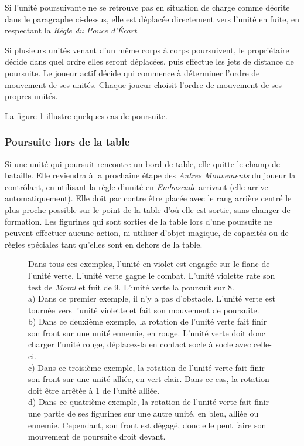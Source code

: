 Si l'unité poursuivante ne se retrouve pas en situation de charge comme décrite dans le paragraphe ci-dessus, elle est déplacée directement vers l'unité en fuite, en respectant la \emph{Règle du Pouce d'Écart}. 

Si plusieurs unités venant d'un même corps à corps poursuivent, le propriétaire décide dans quel ordre elles seront déplacées, puis effectue les jets de distance de poursuite. Le joueur actif décide qui commence à déterminer l'ordre de mouvement de ses unités. Chaque joueur choisit l'ordre de mouvement de ses propres unités.

La figure \ref{figure/poursuite} illustre quelques cas de poursuite.

\subsubsection*{Poursuite hors de la table}

Si une unité qui poursuit rencontre un bord de table, elle quitte le champ de bataille. Elle reviendra à la prochaine étape des \emph{Autres Mouvements} du joueur la contrôlant, en utilisant la règle d'unité en \emph{Embuscade} arrivant (elle arrive automatiquement). Elle doit par contre être placée avec le rang arrière centré le plus proche possible sur le point de la table d'où elle est sortie, sans changer de formation. Les figurines qui sont sorties de la table lors d'une poursuite ne peuvent effectuer aucune action, ni utiliser d'objet magique, de capacités ou de règles spéciales tant qu'elles sont en dehors de la table.


\begin{figure}[!htbp]
\centering
\def\svgwidth{7.7cm}

\caption{Dans tous ces exemples, l'unité en violet est engagée sur le flanc de l'unité verte. L'unité verte gagne le combat. L'unité violette rate son test de \emph{Moral} et fuit de \unit{9}{\pouce}. L'unité verte la poursuit sur \unit{8}{\pouce}. \\
a) Dans ce premier exemple, il n'y a pas d'obstacle. L'unité verte est tournée vers l'unité violette et fait son mouvement de poursuite. \\
b) Dans ce deuxième exemple, la rotation de l'unité verte fait finir son front sur une unité ennemie, en rouge. L'unité verte doit donc charger l'unité rouge, déplacez-la en contact socle à socle avec celle-ci. \\
c) Dans ce troisième exemple, la rotation de l'unité verte fait finir son front sur une unité alliée, en vert clair. Dans ce cas, la rotation doit être arrêtée à \unit{1}{\pouce} de l'unité alliée. \\
d) Dans ce quatrième exemple, la rotation de l'unité verte fait finir une partie de ses figurines sur une autre unité, en bleu, alliée ou ennemie. Cependant, son front est dégagé, donc elle peut faire son mouvement de poursuite droit devant.}
\label{figure/poursuite}
\end{figure}

